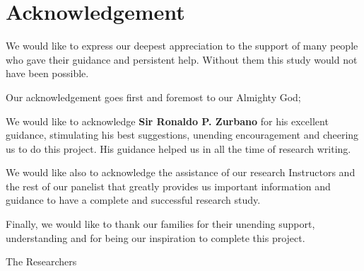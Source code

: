\section*{\hfill Acknowledgement \hfill}

We would like to express our deepest appreciation to the support of many people who gave their guidance and persistent help.
Without them this study would not have been possible.

Our acknowledgement goes first and foremost to our Almighty God;

We would like to acknowledge \textbf{Sir Ronaldo P. Zurbano} for his excellent guidance, stimulating his best suggestions, unending encouragement and cheering us to do this project.
His guidance helped us in all the time of research writing.

We would like also to acknowledge the assistance of our research Instructors and the rest of our panelist that greatly provides us important information and guidance to have a complete and successful research study.

Finally, we would like to thank our families for their unending support, understanding and for being our inspiration to complete this project.

\vspace{4em}

\begin{flushright}
   The Researchers
\end{flushright}
